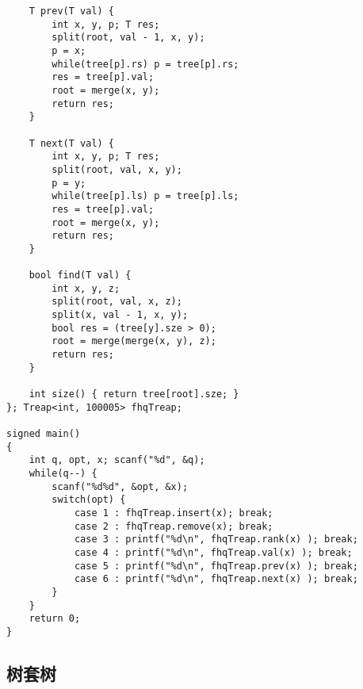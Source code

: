 \begin{lstlisting}
	T prev(T val) {
		int x, y, p; T res;
		split(root, val - 1, x, y);
		p = x;
		while(tree[p].rs) p = tree[p].rs;
		res = tree[p].val;
		root = merge(x, y);
		return res;
	}
	
	T next(T val) {
		int x, y, p; T res;
		split(root, val, x, y);
		p = y;
		while(tree[p].ls) p = tree[p].ls;
		res = tree[p].val;
		root = merge(x, y);
		return res;
	}
	
	bool find(T val) {
		int x, y, z;
		split(root, val, x, z);
		split(x, val - 1, x, y);
		bool res = (tree[y].sze > 0);
		root = merge(merge(x, y), z);
		return res;
	}
	
	int size() { return tree[root].sze; }
}; Treap<int, 100005> fhqTreap;

signed main()
{
	int q, opt, x; scanf("%d", &q);
	while(q--) {
		scanf("%d%d", &opt, &x);
		switch(opt) {
			case 1 : fhqTreap.insert(x); break;
			case 2 : fhqTreap.remove(x); break;
			case 3 : printf("%d\n", fhqTreap.rank(x) ); break;
			case 4 : printf("%d\n", fhqTreap.val(x) ); break;
			case 5 : printf("%d\n", fhqTreap.prev(x) ); break;
			case 6 : printf("%d\n", fhqTreap.next(x) ); break;
		}
	}
	return 0;
}
\end{lstlisting}

\subsection{树套树}

